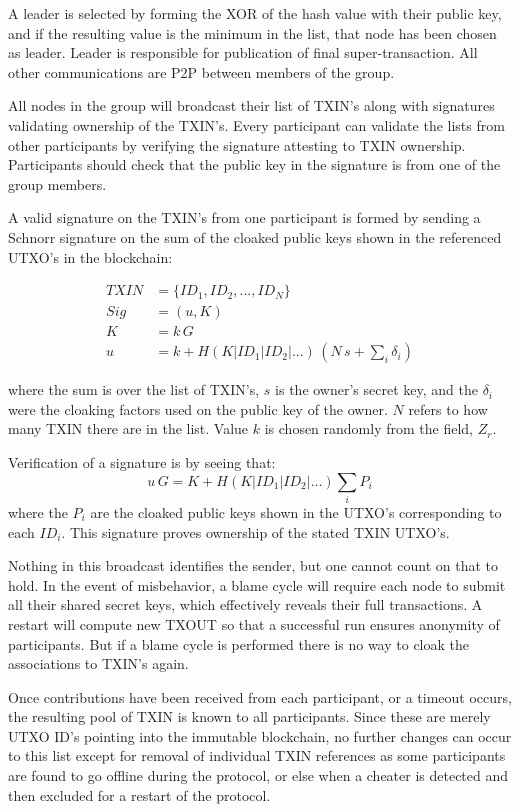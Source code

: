 \documentclass[a4paper, 10pt, conference]{ieeeconf}
\begin{document}
A leader is selected by forming the XOR of the hash value with their public key, and if the resulting value is the minimum in the list, that node has been chosen as leader. Leader is responsible for publication of final super-transaction. All other communications are P2P between members of the group.

All nodes in the group will broadcast their list of TXIN's along with signatures validating ownership of the TXIN's. Every participant can validate the lists from other participants by verifying the signature attesting to TXIN ownership. Participants should check that the public key in the signature is from one of the group members.

A valid signature on the TXIN's from one participant is formed by sending a Schnorr signature on the sum of the cloaked public keys shown in the referenced UTXO's in the blockchain:

\begin{align*}
TXIN &= \{ID_1, ID_2, ..., ID_N\}\\
Sig &= (u, K)\\
K &= k \, G \\
u &= k + H(K | ID_1 | ID_2 | ...) \, (N \, s + \sum_i{\delta_i})
\end{align*}

where the sum is over the list of TXIN's, $s$ is the owner's secret key, and the $\delta_i$ were the cloaking factors used on the public key of the owner. $N$ refers to how many TXIN there are in the list. Value $k$ is chosen randomly from the field, $Z_r$. 

Verification of a signature is by seeing that:
$$u \, G = K + H(K | \mathit{ID}_1 | \mathit{ID}_2 | ...) \sum_i{P_i}$$
where the $P_i$ are the cloaked public keys shown in the UTXO's corresponding to each $\mathit{ID}_i$. This signature proves ownership of the stated TXIN UTXO's.

Nothing in this broadcast identifies the sender, but one cannot count on that to hold. In the event of misbehavior, a blame cycle will require each node to submit all their shared secret keys, which effectively reveals their full transactions. A restart will compute new TXOUT so that a successful run ensures anonymity of participants. But if a blame cycle is performed there is no way to cloak the associations to TXIN's again.

Once contributions have been received from each participant, or a timeout occurs, the resulting pool of TXIN is known to all participants. Since these are merely UTXO ID's pointing into the immutable blockchain, no further changes can occur to this list except for removal of individual TXIN references as some participants are found to go offline during the protocol, or else when a cheater is detected and then excluded for a restart of the protocol.
\end{document}
